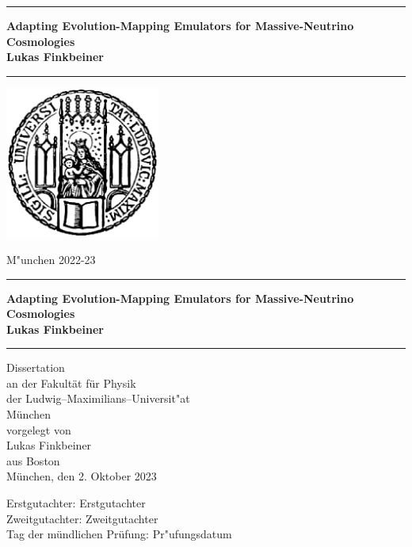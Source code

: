\documentclass[12pt]{book}
\newcommand{\LMUTitle}[9]{
  \thispagestyle{empty}
  \vspace*{\stretch{1}}
  {\parindent0cm
   \rule{\linewidth}{.7ex}}
  \begin{flushright}

    \vspace*{\stretch{1}}
    \sffamily\bfseries\Huge
    #1\\
    \vspace*{\stretch{1}}
    \sffamily\bfseries\large
    #2
    \vspace*{\stretch{1}}
  \end{flushright}
  \rule{\linewidth}{.7ex}
  \vspace*{\stretch{5}}
  \begin{center}
    \includegraphics[width=2in]{siegel}
  \end{center}
  \vspace*{\stretch{1}}
  \begin{center}\sffamily\LARGE{#5}\end{center}
  \newpage
  \thispagestyle{empty}

  \cleardoublepage
  \thispagestyle{empty}

  \vspace*{\stretch{1}}
  {\parindent0cm
  \rule{\linewidth}{.7ex}}
  \begin{flushright}
    \vspace*{\stretch{1}}
    \sffamily\bfseries\Huge
    #1\\
    \vspace*{\stretch{1}}
    \sffamily\bfseries\large
    #2
    \vspace*{\stretch{1}}
  \end{flushright}
  \rule{\linewidth}{.7ex}

  \vspace*{\stretch{3}}
  \begin{center}
    \Large Dissertation\\
    \Large an der #4\\
    \Large der Ludwig--Maximilians--Universit"at\\
    \Large M\"unchen\\
    \vspace*{\stretch{1}}
    \Large vorgelegt von\\
    \Large #2\\
    \Large aus #3\\
    \vspace*{\stretch{2}}
    \Large M\"unchen, den #6
  \end{center}

  \newpage
  \thispagestyle{empty}

  \vspace*{\stretch{1}}

  \begin{flushleft}
    \large Erstgutachter:  #7 \\[1mm]
    \large Zweitgutachter: #8 \\[1mm]
    \large Tag der m\"undlichen Pr\"ufung: #9\\
  \end{flushleft}

  \cleardoublepage
}
\begin{document}
  \frontmatter
  \VerbatimFootnotes

  \LMUTitle
      {Adapting Evolution-Mapping Emulators for Massive-Neutrino Cosmologies}               %
      {Lukas Finkbeiner}                       %
      {Boston}                             %
      {Fakultät für Physik}                         %
      {M"unchen 2022-23}                          %
      {2. Oktober 2023}                            %
      {Erstgutachter}                          %
      {Zweitgutachter}                         %
      {Pr"ufungsdatum}                         %


  \tableofcontents


  \listoffigures


  \listoftables
  \cleardoublepage


  


  \mainmatter\setcounter{page}{1}
  
  
  
  
  
  
  
  


  \backmatter
  
  \markboth{}{}


  


  
\end{document}
